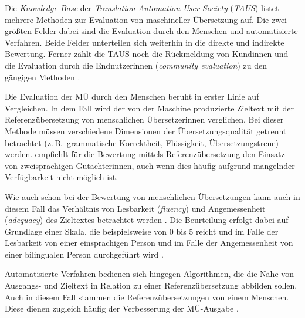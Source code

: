 
Die \emph{Knowledge Base} der \emph{Translation Automation User Society} (\emph{TAUS}) listet mehrere Methoden zur Evaluation von maschineller Übersetzung auf. Die zwei größten Felder dabei sind die Evaluation durch den Menschen und automatisierte Verfahren. Beide Felder unterteilen sich weiterhin in die direkte und indirekte Bewertung. Ferner zählt die TAUS noch die Rückmeldung von Kund{\textperiodcentered}innen und die Evaluation durch die Endnutzer{\textperiodcentered}innen (\emph{community evaluation}) zu den gängigen Methoden \citep[]{translation_automation_user_society_taus_category:evaluation_2017}.

Die Evaluation der MÜ durch den Menschen beruht in erster Linie auf Vergleichen. In dem Fall wird der von der Maschine produzierte Zieltext mit der Referenzübersetzung von menschlichen Übersetzer{\textperiodcentered}innen verglichen. Bei dieser Methode müssen \glqq verschiedene Dimensionen der Übersetzungsqualität getrennt betrachtet (z.\,B.\ grammatische Korrektheit, Flüssigkeit, Übersetzungstreue)\grqq{} \citep[653]{carstensen_computerlinguistik_2010} werden. \citet[218]{koehn_statistical_2009} empfiehlt für die Bewertung mittels Referenzübersetzung den Einsatz von zweisprachigen Gutachter{\textperiodcentered}\linebreak[3]innen, auch wenn dies häufig aufgrund mangelnder Verfügbarkeit nicht möglich ist.

Wie auch schon bei der Bewertung von menschlichen Übersetzungen kann auch in diesem Fall das Verhältnis von Lesbarkeit (\emph{fluency}) und Angemessenheit (\emph{adequacy}) des Zieltextes betrachtet werden \citep[219]{koehn_statistical_2009}. Die Beurteilung erfolgt dabei auf Grundlage einer Skala, die beispielsweise von 0 bis 5 reicht und im Falle der Lesbarkeit von einer einsprachigen Person und im Falle der Angemessenheit von einer bilingualen Person durchgeführt wird \citep[2]{laubli_has_2018}. 

Automatisierte Verfahren bedienen sich hingegen Algorithmen, die die Nähe von Ausgangs- und Zieltext in Relation zu einer Referenzübersetzung abbilden sollen. Auch in diesem Fall stammen die Referenzübersetzungen von einem Menschen. Diese dienen zugleich häufig der Verbesserung der MÜ-Ausgabe \citep[]{lommel_using_2014, laubli_has_2018, ott_analyzing_2018, khayrallah_simulated_2020}. 

